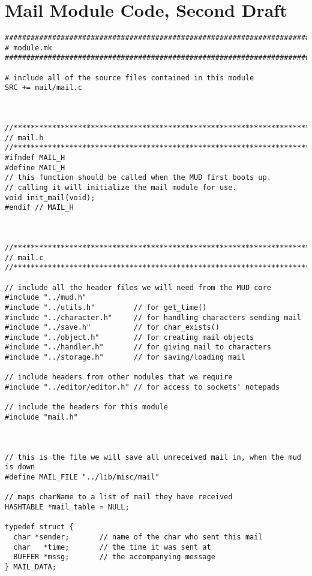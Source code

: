 \documentclass[12pt]{article}
\begin{document}
\newpage \section{Mail Module Code, Second Draft}
{\bf \begin{verbatim}
################################################################################
# module.mk
################################################################################

# include all of the source files contained in this module
SRC += mail/mail.c



//*****************************************************************************
// mail.h
//*****************************************************************************
#ifndef MAIL_H
#define MAIL_H
// this function should be called when the MUD first boots up.
// calling it will initialize the mail module for use.
void init_mail(void);
#endif // MAIL_H



//*****************************************************************************
// mail.c
//*****************************************************************************

// include all the header files we will need from the MUD core
#include "../mud.h"
#include "../utils.h"         // for get_time()
#include "../character.h"     // for handling characters sending mail
#include "../save.h"          // for char_exists()
#include "../object.h"        // for creating mail objects
#include "../handler.h"       // for giving mail to characters
#include "../storage.h"       // for saving/loading mail

// include headers from other modules that we require
#include "../editor/editor.h" // for access to sockets' notepads

// include the headers for this module
#include "mail.h"



// this is the file we will save all unreceived mail in, when the mud is down
#define MAIL_FILE "../lib/misc/mail"

// maps charName to a list of mail they have received
HASHTABLE *mail_table = NULL;

typedef struct {
  char *sender;       // name of the char who sent this mail
  char   *time;       // the time it was sent at
  BUFFER *mssg;       // the accompanying message
} MAIL_DATA;


\end{verbatim}}
\end{document}
